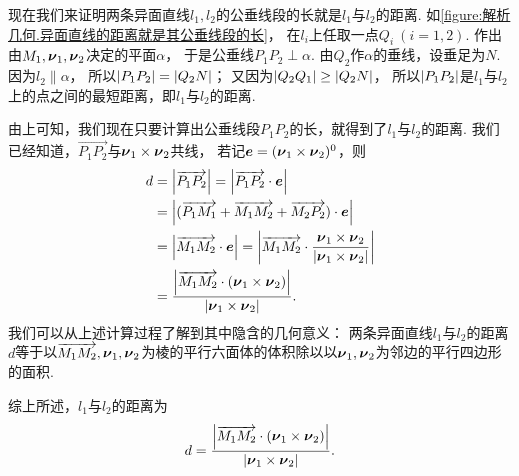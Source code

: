 现在我们来证明两条异面直线\(l_1,l_2\)的公垂线段的长就是\(l_1\)与\(l_2\)的距离.
如\cref{figure:解析几何.异面直线的距离就是其公垂线段的长}，
在\(l_i\)上任取一点\(Q_i\ (i=1,2)\).
作出由\(M_1,\boldsymbol{\nu}_1,\boldsymbol{\nu}_2\)决定的平面\(\alpha\)，
于是公垂线\(P_1 P_2 \perp \alpha\).
由\(Q_2\)作\(\alpha\)的垂线，设垂足为\(N\).
因为\(l_2 \parallel \alpha\)，
所以\(\abs{P_1 P_2} = \abs{Q_2 N}\)；
又因为\(\abs{Q_2 Q_1} \geq \abs{Q_2 N}\)，
所以\(\abs{P_1 P_2}\)是\(l_1\)与\(l_2\)上的点之间的最短距离，即\(l_1\)与\(l_2\)的距离.

由上可知，我们现在只要计算出公垂线段\(P_1 P_2\)的长，就得到了\(l_1\)与\(l_2\)的距离.
我们已经知道，\(\vec{P_1 P_2}\)与\(\boldsymbol{\nu}_1\times\boldsymbol{\nu}_2\)共线，
若记\(\boldsymbol{e} = (\boldsymbol{\nu}_1\times\boldsymbol{\nu}_2)^0\)，则\begin{align*}
	d &= \abs{\overrightarrow{P_1 P_2}}
	= \abs{\overrightarrow{P_1 P_2}\cdot\boldsymbol{e}} \\
	&= \abs{
			(\overrightarrow{P_1 M_1} + \overrightarrow{M_1 M_2} + \overrightarrow{M_2 P_2})\cdot\boldsymbol{e}
		} \\
	&= \abs{\overrightarrow{M_1 M_2}\cdot\boldsymbol{e}}
	= \abs{
			\overrightarrow{M_1 M_2}\cdot\frac{\boldsymbol{\nu}_1\times\boldsymbol{\nu}_2}{\abs{\boldsymbol{\nu}_1\times\boldsymbol{\nu}_2}}
		} \\
	&= \frac{
			\abs{
				\overrightarrow{M_1 M_2}\cdot(\boldsymbol{\nu}_1\times\boldsymbol{\nu}_2)
			}
		}{
			\abs{
				\boldsymbol{\nu}_1\times\boldsymbol{\nu}_2
			}
		}.
\end{align*}
我们可以从上述计算过程了解到其中隐含的几何意义：
两条异面直线\(l_1\)与\(l_2\)的距离\(d\)等于以\(\overrightarrow{M_1 M_2},\boldsymbol{\nu}_1,\boldsymbol{\nu}_2\)为棱的平行六面体的体积除以以\(\boldsymbol{\nu}_1,\boldsymbol{\nu}_2\)为邻边的平行四边形的面积.

综上所述，\(l_1\)与\(l_2\)的距离为
\begin{equation}
	d = \frac{
			\abs{
				\overrightarrow{M_1 M_2}\cdot(\boldsymbol{\nu}_1\times\boldsymbol{\nu}_2)
			}
		}{
			\abs{
				\boldsymbol{\nu}_1\times\boldsymbol{\nu}_2
			}
		}.
\end{equation}

